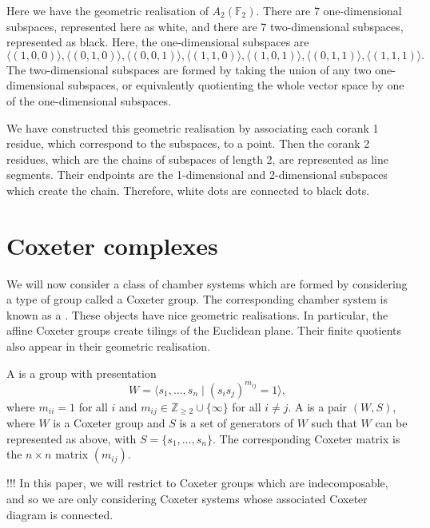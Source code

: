 \documentclass[11pt]{article}
\begin{document}
\begin{example} \label{AnK}
    Here we have the geometric realisation of $A_2(\mathbb{F}_2)$. There are 7 one-dimensional subspaces, represented here as white, and there are 7 two-dimensional subspaces, represented as black. Here, the one-dimensional subspaces are
    \[\langle (1,0,0)\rangle, \langle (0,1,0)\rangle,\langle (0,0,1)\rangle,\langle (1,1,0)\rangle,\langle (1,0,1)\rangle,\langle (0,1,1)\rangle,\langle (1,1,1)\rangle.\]
    The two-dimensional subspaces are formed by taking the union of any two one-dimensional subspaces, or equivalently quotienting the whole vector space by one of the one-dimensional subspaces. 

    We have constructed this geometric realisation by associating each corank 1 residue, which correspond to the subspaces, to a point. Then the corank 2 residues, which are the chains of subspaces of length 2, are represented as line segments. Their endpoints are the 1-dimensional and 2-dimensional subspaces which create the chain. Therefore, white dots are connected to black dots.
\end{example}

\section{Coxeter complexes} \label{3}

We will now consider a class of chamber systems which are formed by considering a type of group called a Coxeter group. The corresponding chamber system is known as a . These objects have nice geometric realisations. In particular, the affine Coxeter groups create tilings of the Euclidean plane. Their finite quotients also appear in their geometric realisation. 

\begin{definition}
    A  is a group with presentation
    \[W=\langle s_1,\hdots , s_n \mid (s_is_j)^{m_{ij}}=1\rangle,\]
    where $m_{ii}=1$ for all $i$ and $m_{ij}\in \mathbb{Z}_{\geq 2}\cup\{\infty\}$ for all $i\neq j$. 
    A  is a pair $(W,S)$, where $W$ is a Coxeter group and $S$ is a set of generators of $W$ such that $W$ can be represented as above, with $S=\{s_1,\hdots,s_n\}$. The corresponding Coxeter matrix is the $n\times n$ matrix $(m_{ij})$. 
\end{definition}

!!! In this paper, we will restrict to Coxeter groups which are indecomposable, and so we are only considering Coxeter systems whose associated Coxeter diagram is connected. 
\end{document}
